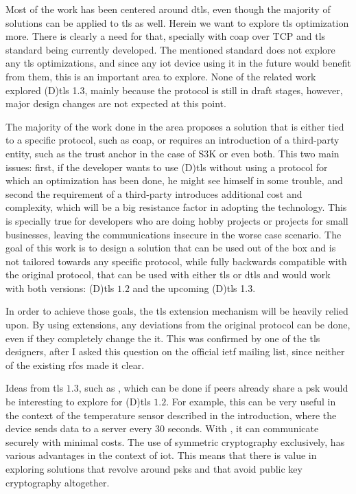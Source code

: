 \documentclass{llncs}
\begin{document}
{Most of the work has been centered around \gls{dtls},
even though the majority of solutions can be applied to \gls{tls} as well.
Herein we want to explore \gls{tls} optimization more. There is clearly a need for that, specially with \gls{coap} over
TCP and \gls{tls} standard being currently developed. The mentioned standard does not explore any \gls{tls}
optimizations, and since any \gls{iot} device using it in the future would benefit from
them, this is an important area to explore. None of the related work explored
(D)\gls{tls} 1.3, mainly because the protocol is still in draft stages, however, major design changes are not expected at this point.

The majority of the work done in the area proposes a solution that is either tied to a
specific protocol, such as \gls{coap}, or requires an introduction of a third-party
entity, such as the trust anchor in the case of S3K\cite{S3KScala62:online} or
even both. This two main issues: first, if the developer wants to use (D)\gls{tls}
without using a protocol for which an optimization has been done,
he might see himself in some trouble, and second the requirement of a third-party
introduces additional cost and complexity, which will be a big resistance factor
in adopting the technology. This is specially true for developers who are doing
hobby projects or projects for small businesses, leaving the communications insecure
in the worse case scenario. The goal of this work is to design a solution that can be used out
of the box and is not tailored towards any specific protocol, while fully backwards
compatible with the original protocol, that can be used with either \gls{tls}
or \gls{dtls} and would work with both versions: (D)\gls{tls} $1.2$ and the upcoming
(D)\gls{tls} 1.3.

In order to achieve those goals, the \gls{tls} extension
mechanism will be heavily relied upon. By using extensions, any deviations from the original protocol can be done, even if they completely change the it. This was confirmed by
one of the \gls{tls} designers, after I asked this question on the official
\gls{ietf} mailing list\cite{ReTLSTLS31:online}, since neither of the existing \gls{rfc}s made it clear.

Ideas from \gls{tls} $1.3$, such as , which can be done if peers already share a \gls{psk} would be interesting to
explore for (D)\gls{tls} $1.2$.
For example, this can be very useful in the context of the temperature sensor
described in the introduction, where the device sends data to a server every
30 seconds. With , it can communicate securely with minimal costs.
The use of symmetric cryptography exclusively, has various advantages in the context
of \gls{iot}. This means that there is value in exploring solutions that revolve around
\gls{psk}s and that avoid public key cryptography altogether.

}
\end{document}
